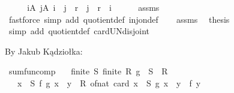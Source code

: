 \begin{isabellebody}
%
\isadelimproof
%
\endisadelimproof
%
\isatagproof
{}\isamarkupfalse%
\ {\isacharminus}{\kern0pt}\isanewline
\ \ \isamarkupfalse%
\ {\isachardoublequoteopen}{\isasymforall}i{\isasymin}A{\isachardot}{\kern0pt}\ {\isasymforall}j{\isasymin}A{\isachardot}{\kern0pt}\ i\ {\isasymnoteq}\ j\ {\isasymlongrightarrow}\ r\ {\isacharbackquote}{\kern0pt}{\isacharbackquote}{\kern0pt}\ {\isacharbraceleft}{\kern0pt}j{\isacharbraceright}{\kern0pt}\ {\isasymnoteq}\ r\ {\isacharbackquote}{\kern0pt}{\isacharbackquote}{\kern0pt}\ {\isacharbraceleft}{\kern0pt}i{\isacharbraceright}{\kern0pt}{\isachardoublequoteclose}\isanewline
\ \ \ \ \isamarkupfalse%
\ assms\ \isamarkupfalse%
\ {\isacharparenleft}{\kern0pt}fastforce\ simp\ add{\isacharcolon}{\kern0pt}\ quotient{\isacharunderscore}{\kern0pt}def\ inj{\isacharunderscore}{\kern0pt}on{\isacharunderscore}{\kern0pt}def{\isacharparenright}{\kern0pt}\isanewline
\ \ \isamarkupfalse%
\ assms\ \isamarkupfalse%
\ {\isacharquery}{\kern0pt}thesis\isanewline
\ \ \ \ \isamarkupfalse%
\ {\isacharparenleft}{\kern0pt}simp\ add{\isacharcolon}{\kern0pt}\ quotient{\isacharunderscore}{\kern0pt}def\ card{\isacharunderscore}{\kern0pt}UN{\isacharunderscore}{\kern0pt}disjoint{\isacharparenright}{\kern0pt}\isanewline
{}\isamarkupfalse%
%
\endisatagproof
{\isafoldproof}%
%
\isadelimproof
%
\endisadelimproof
%
\begin{isamarkuptext}%
By Jakub Kądziołka:%
\end{isamarkuptext}\isamarkuptrue%
\isamarkupfalse%
\ sum{\isacharunderscore}{\kern0pt}fun{\isacharunderscore}{\kern0pt}comp{\isacharcolon}{\kern0pt}\isanewline
\ \ \ {\isachardoublequoteopen}finite\ S{\isachardoublequoteclose}\ {\isachardoublequoteopen}finite\ R{\isachardoublequoteclose}\ {\isachardoublequoteopen}g\ {\isacharbackquote}{\kern0pt}\ S\ {\isasymsubseteq}\ R{\isachardoublequoteclose}\isanewline
\ \ \ {\isachardoublequoteopen}{\isacharparenleft}{\kern0pt}{\isasymSum}x\ {\isasymin}\ S{\isachardot}{\kern0pt}\ f\ {\isacharparenleft}{\kern0pt}g\ x{\isacharparenright}{\kern0pt}{\isacharparenright}{\kern0pt}\ {\isacharequal}{\kern0pt}\ {\isacharparenleft}{\kern0pt}{\isasymSum}y\ {\isasymin}\ R{\isachardot}{\kern0pt}\ of{\isacharunderscore}{\kern0pt}nat\ {\isacharparenleft}{\kern0pt}card\ {\isacharbraceleft}{\kern0pt}x\ {\isasymin}\ S{\isachardot}{\kern0pt}\ g\ x\ {\isacharequal}{\kern0pt}\ y{\isacharbraceright}{\kern0pt}{\isacharparenright}{\kern0pt}\ {\isacharasterisk}{\kern0pt}\ f\ y{\isacharparenright}{\kern0pt}{\isachardoublequoteclose}\isanewline

\end{isabellebody}
